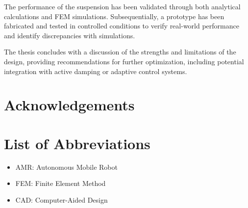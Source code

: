 \documentclass[11pt]{article}
\begin{document}
The performance of the suspension has been validated through both analytical calculations and FEM simulations. Subsequentially, a prototype has been fabricated and tested in controlled conditions to verify real-world performance and identify discrepancies with simulations.

The thesis concludes with a discussion of the strengths and limitations of the design, providing recommendations for further optimization, including potential integration with active damping or adaptive control systems.


\newpage
\thispagestyle{empty}

\section*{Acknowledgements}

\newpage
\thispagestyle{empty}
\tableofcontents

\newpage
\thispagestyle{empty}
\listoffigures

\newpage
\thispagestyle{empty}
\listoftables

\newpage
\thispagestyle{empty}
\section*{List of Abbreviations}
\begin{itemize}
    \item AMR: Autonomous Mobile Robot
    \item FEM: Finite Element Method
    \item CAD: Computer-Aided Design
\end{itemize}

\newpage
\thispagestyle{empty}
\end{document}
